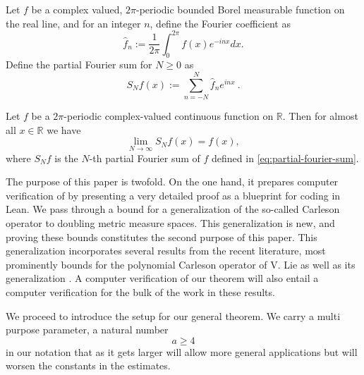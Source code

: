 Let $f$ be a complex valued, $2\pi$-periodic bounded Borel measurable function on the real line, and for an integer $n$, define the Fourier coefficient as
\begin{equation}
    \widehat{f}_n:=\frac {1}{2\pi} \int_0^{2\pi} f(x) e^{- i nx} dx .
\end{equation}
Define the partial Fourier sum for $N\ge 0$ as
\begin{equation}\label{eq:partial-fourier-sum}
    S_Nf(x):=\sum_{n=-N}^N \widehat{f}_n e^{i nx}\ .
\end{equation}

\begin{theorem}
    \label{classical-carleson}
    \leanok
    Let $f$ be a $2\pi$-periodic complex-valued continuous function on $\mathbb{R}$.
    Then for almost all $x \in \mathbb{R}$ we have
    \begin{equation}\label{eq:fourier-limit}
      \lim_{N\to\infty}S_N f(x) = f(x),
    \end{equation}
    where $S_N f$ is the $N$-th partial Fourier sum of $f$ defined in \eqref{eq:partial-fourier-sum}.
\end{theorem}

The purpose of this paper is twofold. On the one hand, it prepares computer verification of  by presenting a very detailed proof as a blueprint for coding in Lean. We pass through a bound for a generalization of the so-called Carleson operator to doubling metric measure spaces. This generalization is new, and proving these bounds constitutes the second purpose of this paper. This generalization incorporates several results from the recent literature, most prominently bounds for the polynomial Carleson operator of V. Lie \cite{lie-polynomial} as well as its generalization \cite{zk-polynomial}. A computer verification of our theorem will also entail a computer verification for the bulk of the work in these results.

We proceed to introduce the setup for our general theorem.
We carry a multi purpose parameter, a natural number
\begin{equation}
    a\ge 4
\end{equation} in our notation that as it gets larger will allow more general applications but will worsen the constants in the estimates.



